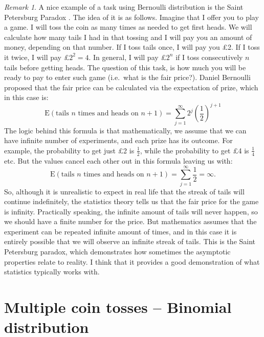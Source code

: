 \documentclass[
]{book}
\theoremstyle{definition}
\theoremstyle{definition}
\theoremstyle{definition}
\theoremstyle{definition}
\theoremstyle{remark}
\newtheorem*{remark}{Remark}
\begin{document}
\begin{remark}
A nice example of a task using Bernoulli distribution is the Saint Petersburg Paradox \citep[page 8318]{Kotz2005}. The idea of it is as follows. Imagine that I offer you to play a game. I will toss the coin as many times as needed to get first heads. We will calculate how many tails I had in that tossing and I will pay you an amount of money, depending on that number. If I toss tails once, I will pay you £2. If I toss it twice, I will pay £\(2^2=4\). In general, I will pay £\(2^n\) if I toss consecutively \(n\) tails before getting heads. The question of this task, is how much you will be ready to pay to enter such game (i.e.~what is the fair price?). Daniel Bernoulli proposed that the fair price can be calculated via the expectation of prize, which in this case is:
\begin{equation*}
    \mathrm{E}(\text{tails }n\text{ times and heads on }n+1) = \sum_{j=1}^\infty 2^{j} \left(\frac{1}{2}\right)^{j+1} 
\end{equation*}
The logic behind this formula is that mathematically, we assume that we can have infinite number of experiments, and each prize has its outcome. For example, the probability to get just £2 is \(\frac{1}{2}\), while the probability to get £4 is \(\frac{1}{4}\) etc. But the values cancel each other out in this formula leaving us with:
\begin{equation*}
    \mathrm{E}(\text{tails }n\text{ times and heads on }n+1) = \sum_{j=1}^\infty \frac{1}{2} = \infty .
\end{equation*}
So, although it is unrealistic to expect in real life that the streak of tails will continue indefinitely, the statistics theory tells us that the fair price for the game is infinity. Practically speaking, the infinite amount of tails will never happen, so we should have a finite number for the price. But mathematics assumes that the experiment can be repeated infinite amount of times, and in this case it is entirely possible that we will observe an infinite streak of tails. This is the Saint Petersburg paradox, which demonstrates how sometimes the asymptotic properties relate to reality. I think that it provides a good demonstration of what statistics typically works with.
\end{remark}

\hypertarget{distributionBinomial}{%
\section{Multiple coin tosses -- Binomial distribution}\label{distributionBinomial}}
\end{document}
